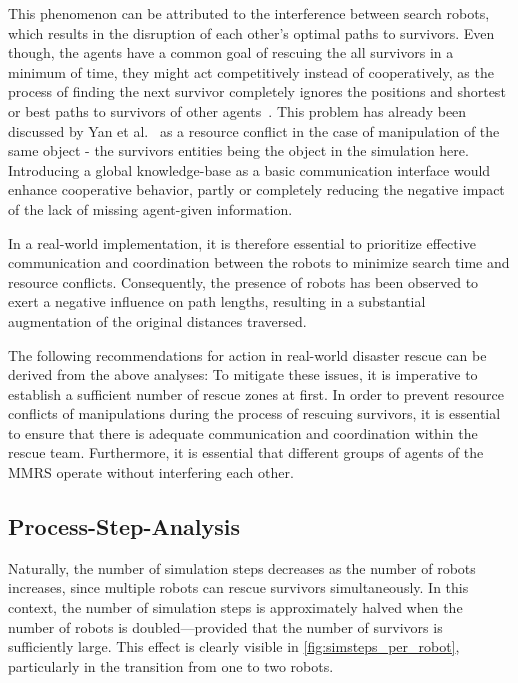 \documentclass[a4paper,twoside]{article}
\begin{document}
This phenomenon can be attributed to the interference between search robots, which results in the disruption of each other's optimal paths to survivors. Even though, the agents have a common goal of rescuing the all survivors in a minimum of time, they might act competitively instead of cooperatively, as the process of finding the next survivor completely ignores the positions and shortest or best paths to survivors of other agents\ \cite{russell2002artificial}. This problem has already been discussed by Yan et al.\ \cite{yan2013survey} as a resource conflict in the case of manipulation of the same object - the survivors entities being the object in the simulation here. Introducing a global knowledge-base as a basic communication interface would enhance cooperative behavior, partly or completely reducing the negative impact of the lack of missing agent-given information.

In a real-world implementation, it is therefore essential to prioritize effective communication and coordination between the robots to minimize search time and resource conflicts.
Consequently, the presence of robots has been observed to exert a negative influence on path lengths, resulting in a substantial augmentation of the original distances traversed. 

The following recommendations for action in real-world disaster rescue can be derived from the above analyses:
To mitigate these issues, it is imperative to establish a sufficient number of rescue zones at first.
In order to prevent resource conflicts of manipulations during the process of rescuing survivors, it is essential to ensure that there is adequate communication and coordination within the rescue team.
Furthermore, it is essential that different groups of agents of the MMRS operate without interfering each other.

\subsection{Process-Step-Analysis}
\label{subsec:process_step_analysis}

Naturally, the number of simulation steps decreases as the number of robots increases, since multiple robots can rescue survivors simultaneously.
In this context, the number of simulation steps is approximately halved when the number of robots is doubled—provided that the number of survivors is sufficiently large. 
This effect is clearly visible in \autoref{fig:simsteps_per_robot}, particularly in the transition from one to two robots.
\end{document}
